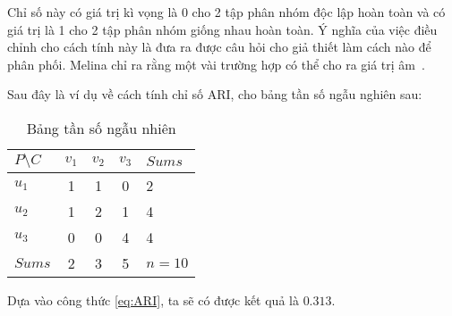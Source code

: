 Chỉ số này có giá trị kì vọng là 0 cho 2 tập phân nhóm độc lập hoàn toàn và có giá trị là 1 cho 2 tập phân nhóm giống nhau hoàn toàn.
Ý nghĩa của việc điều chỉnh cho cách tính này là đưa ra được câu hỏi cho giả thiết làm cách nào để phân phối.
Melina chỉ ra rằng một vài trường hợp có thể cho ra giá trị âm~\cite{Melina-ARI}.

Sau đây là ví dụ về cách tính chỉ số ARI, cho bảng tần số ngẫu nghiên sau:
\begin{table}[ht]
\begin{center}
\begin{tabular}{l|c c c|l}
\hline
$P \setminus C$ & $v_1$ & $v_2$ & $v_3$ & $Sums$ \\
\hline
$u_1$ & 1 & 1 & 0 & 2 \\
$u_2$ & 1 & 2 & 1 & 4 \\
$u_3$ & 0 & 0 & 4 & 4 \\
\hline
$Sums$ & 2 & 3 & 5 & $n = 10$ \\
\end{tabular}
\caption[Bảng tần số ngẫu nhiên]{Bảng tần số ngẫu nhiên}
\label{bang_4_5}
\end{center}
\end{table}

Dựa vào công thức \ref{eq:ARI}, ta sẽ có được kết quả là $0.313$.

%
%		
%		
%
%
%

